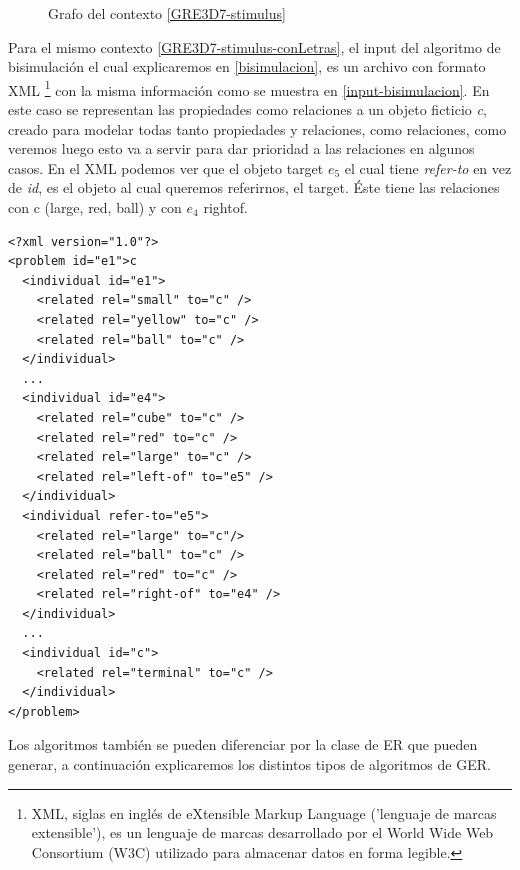 \begin{figure}[ht]
\begin{tikzpicture}
 \end{tikzpicture}
\caption{Grafo del contexto \ref{GRE3D7-stimulus}}
\label{grafo-GRE3D7-stimulus}
\end{figure}

Para el mismo contexto \ref{GRE3D7-stimulus-conLetras}, el input del algoritmo de bisimulaci\'on el cual explicaremos en \ref{bisimulacion}, es un archivo con formato XML \footnote{XML, siglas en ingl\'es de eXtensible Markup Language ('lenguaje de marcas extensible'), es un lenguaje de marcas desarrollado por el World Wide Web Consortium (W3C) utilizado para almacenar datos en forma legible.} con la misma informaci\'on como se muestra en \ref{input-bisimulacion}. En este caso se representan las propiedades como relaciones a un objeto ficticio {\it c}, creado para modelar todas tanto propiedades y relaciones, como relaciones, como veremos luego esto va a servir para dar prioridad a las relaciones en algunos casos. En el XML podemos ver que el objeto target $e_5$ el cual tiene {\it refer-to} en vez de {\it id}, es el objeto al cual queremos referirnos, el target. \'Este tiene las relaciones con c (large, red, ball) y con $e_4$ rightof.  

\label{input-bisimulacion}
\begin{verbatim}
<?xml version="1.0"?>
<problem id="e1">c
  <individual id="e1">
    <related rel="small" to="c" />
    <related rel="yellow" to="c" />
    <related rel="ball" to="c" />
  </individual>
  ...
  <individual id="e4">
    <related rel="cube" to="c" />
    <related rel="red" to="c" />
    <related rel="large" to="c" />
    <related rel="left-of" to="e5" />
  </individual>
  <individual refer-to="e5">
    <related rel="large" to="c"/>
    <related rel="ball" to="c" />
    <related rel="red" to="c" />
    <related rel="right-of" to="e4" />
  </individual>
  ...
  <individual id="c">
    <related rel="terminal" to="c" />
  </individual> 
</problem>
\end{verbatim}


Los algoritmos tambi\'en se pueden diferenciar por la clase de ER que pueden generar, a continuaci\'on explicaremos los distintos tipos de algoritmos de GER. 

